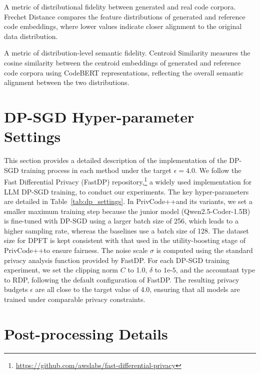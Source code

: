 \documentclass{article}
\theoremstyle{plain}
\theoremstyle{definition}
\theoremstyle{remark}
\def \toolname{PrivCode++}
\begin{document}
{ A metric of distributional fidelity between generated and real code corpora. Frechet Distance compares the feature distributions of generated and reference code embeddings, where lower values indicate closer alignment to the original data distribution.

 A metric of distribution-level semantic fidelity. Centroid Similarity measures the cosine similarity between the centroid embeddings of generated and reference code corpora using CodeBERT representations, reflecting the overall semantic alignment between the two distributions.




\section{DP-SGD Hyper-parameter Settings}
\label{app:dp setting}

This section provides a detailed description of the implementation of the DP-SGD training process in each method under the target $\epsilon=4.0$. We follow the Fast Differential Privacy (FastDP) repository,\footnote{\url{https://github.com/awslabs/fast-differential-privacy}} a widely used implementation for LLM DP-SGD training, to conduct our experiments. The key hyper-parameters are detailed in Table~\ref{tab:dp_settings}. In \toolname and its variants, we set a smaller maximum training step because the junior model (Qwen2.5-Coder-1.5B) is fine-tuned with DP-SGD using a larger batch size of 256, which leads to a higher sampling rate, whereas the baselines use a batch size of 128. The dataset size for DPFT is kept consistent with that used in the utility-boosting stage of \toolname to ensure fairness. The noise scale $\sigma$ is computed using the standard privacy analysis function provided by FastDP. For each DP-SGD training experiment, we set the clipping norm $C$ to 1.0, $\delta$ to $1\text{e-}5$, and the accountant type to RDP, following the default configuration of FastDP. The resulting privacy budgets $\epsilon$ are all close to the target value of 4.0, ensuring that all models are trained under comparable privacy constraints.




\section{Post-processing Details}
\label{app:post-processing}

}
\end{document}
